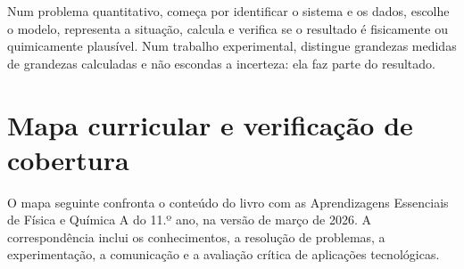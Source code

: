 \documentclass[11pt,a4paper,oneside]{book}
\begin{document}
Num problema quantitativo, começa por identificar o sistema e os dados, escolhe o modelo, representa a situação, calcula e verifica se o resultado é fisicamente ou quimicamente plausível. Num trabalho experimental, distingue grandezas medidas de grandezas calculadas e não escondas a incerteza: ela faz parte do resultado.

\chapter*{Mapa curricular e verificação de cobertura}
\begin{curriculo}
O mapa seguinte confronta o conteúdo do livro com as Aprendizagens Essenciais de Física e Química A do 11.º ano, na versão de março de 2026. A correspondência inclui os conhecimentos, a resolução de problemas, a experimentação, a comunicação e a avaliação crítica de aplicações tecnológicas.
\end{curriculo}
\end{document}
